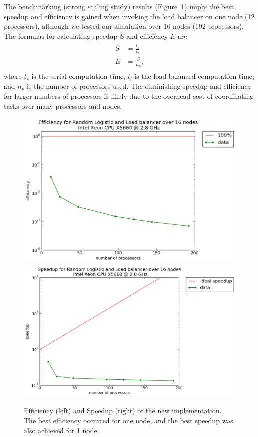 The benchmarking (strong scaling study) results (Figure~\ref{fig:effsp}) imply
the best speedup and efficiency is gained when invoking the load balancer on
one node (12 processors), although we tested our simulation over 16 nodes
(192 processors). The formulas for calculating speedup $S$ and
efficiency $E$ are
\begin{align}
\begin{split}
S &= \frac{t_s}{t_l}\\
E &= \frac{S}{n_p},
\end{split}
\end{align}
where $t_s$ is the serial computation time, $t_l$ is the load balanced
computation time, and $n_p$ is the number of processors used. The
diminishing speedup and efficiency for larger numbers of processors is
likely due to the overhead cost of coordinating tasks over many
processors and nodes. 
\begin{figure}[!h]
\caption[Impact of the load balancing tool: Efficiency and
Speedup]{Efficiency (left) and Speedup (right) of the new
  implementation. The best efficiency occurred for one node, and the best speedup was also achieved for 1 node.}\label{fig:effsp}
\centering
\includegraphics[width=.5\textwidth]{figs/efficiency_random_logistic.png}\hfill
\includegraphics[width=.5\textwidth]{figs/speedup_random_logistic.png}
\end{figure}